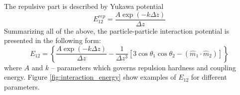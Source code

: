 The repulsive part is described by Yukawa potential
\begin{equation}
\label{eq_yukawa_interaction}
E_{12}^{rep} = \frac{A \exp(-k \Delta z)}{\Delta z}
\end{equation}
Summarizing all of the above, the particle-particle interaction potential is presented in the following form:
\begin{equation}
\label{eq:full_particle_particle_interraction}
E_{12} = \left\{ \frac{A \exp(-k \Delta z)}{\Delta z} -  \frac{1}{\Delta z^3} [3 \cos \theta_1 \cos \theta_2 - (\hat{m}_1 \cdot \hat{m}_2)]\right\}
\end{equation}
where $A$ and $k$ -- parameters which governs repulsion hardness and coupling energy. Figure \ref{fig:interaction_energy} show examples of $E_{12}$ for different parameters.


